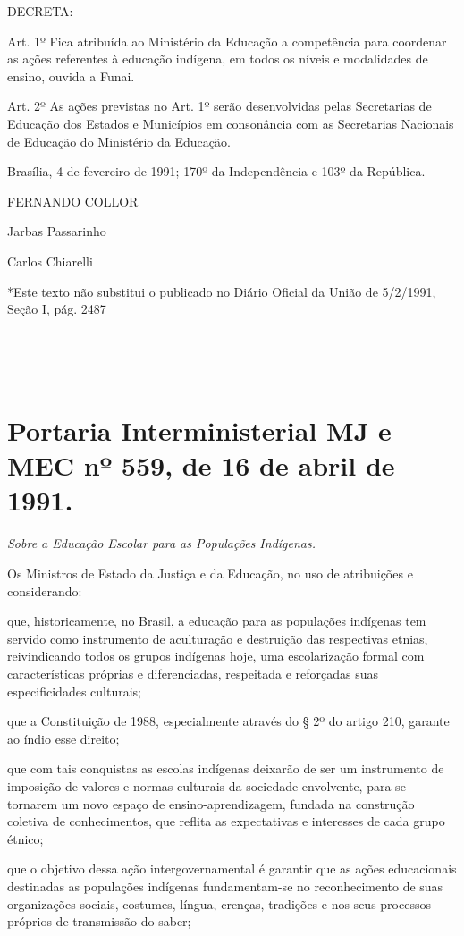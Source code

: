\documentclass[
]{book}
\begin{document}
DECRETA:

Art. 1º Fica atribuída ao Ministério da Educação a competência para coordenar as ações referentes à educação indígena, em todos os níveis e modalidades de ensino, ouvida a Funai.

Art. 2º As ações previstas no Art. 1º serão desenvolvidas pelas Secretarias de Educação dos Estados e Municípios em consonância com as Secretarias Nacionais de Educação do Ministério da Educação.

Brasília, 4 de fevereiro de 1991; 170º da Independência e 103º da República.

FERNANDO COLLOR

Jarbas Passarinho

Carlos Chiarelli

*Este texto não substitui o publicado no Diário Oficial da União de 5/2/1991, Seção I, pág. 2487

~

~

\hypertarget{portaria-interministerial-mj-e-mec-nuxba-559-de-16-de-abril-de-1991.}{%
\section{Portaria Interministerial MJ e MEC nº 559, de 16 de abril de 1991.}\label{portaria-interministerial-mj-e-mec-nuxba-559-de-16-de-abril-de-1991.}}

\emph{Sobre a Educação Escolar para as Populações Indígenas.}

Os Ministros de Estado da Justiça e da Educação, no uso de atribuições e considerando:

que, historicamente, no Brasil, a educação para as populações indígenas tem servido como instrumento de aculturação e destruição das respectivas etnias, reivindicando todos os grupos indígenas hoje, uma escolarização formal com características próprias e diferenciadas, respeitada e reforçadas suas especificidades culturais;

que a Constituição de 1988, especialmente através do § 2º do artigo 210, garante ao índio esse direito;

que com tais conquistas as escolas indígenas deixarão de ser um instrumento de imposição de valores e normas culturais da sociedade envolvente, para se tornarem um novo espaço de ensino-aprendizagem, fundada na construção coletiva de conhecimentos, que reflita as expectativas e interesses de cada grupo étnico;

que o objetivo dessa ação intergovernamental é garantir que as ações educacionais destinadas as populações indígenas fundamentam-se no reconhecimento de suas organizações sociais, costumes, língua, crenças, tradições e nos seus processos próprios de transmissão do saber;
\end{document}
